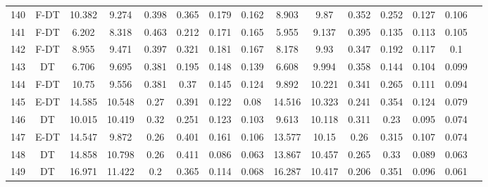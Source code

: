 \begin{longtable}{@{\hskip3pt}c@{\hskip3pt}c@{\hskip3pt}c@{\hskip3pt}c@{\hskip3pt}c@{\hskip3pt}c@{\hskip3pt}c@{\hskip3pt}c@{\hskip3pt}c@{\hskip3pt}c@{\hskip3pt}c@{\hskip3pt}c@{\hskip3pt}c@{\hskip3pt}c@{\hskip3pt}c}
        140 &           F-DT &            10.382 &       9.274 &           0.398 &           0.365 &           0.179 &           0.162 &               8.903 &        9.87 &           0.352 &         0.252 &          0.127 &           0.106 \\
        141 &           F-DT &             6.202 &       8.318 &           0.463 &           0.212 &           0.171 &           0.165 &               5.955 &       9.137 &           0.395 &         0.135 &          0.113 &           0.105 \\
        142 &           F-DT &             8.955 &       9.471 &           0.397 &           0.321 &           0.181 &           0.167 &               8.178 &        9.93 &           0.347 &         0.192 &          0.117 &             0.1 \\
        143 &             DT &             6.706 &       9.695 &           0.381 &           0.195 &           0.148 &           0.139 &               6.608 &       9.994 &           0.358 &         0.144 &          0.104 &           0.099 \\
        144 &           F-DT &             10.75 &       9.556 &           0.381 &            0.37 &           0.145 &           0.124 &               9.892 &      10.221 &           0.341 &         0.265 &          0.111 &           0.094 \\
        145 &           E-DT &            14.585 &      10.548 &            0.27 &           0.391 &           0.122 &            0.08 &              14.516 &      10.323 &           0.241 &         0.354 &          0.124 &           0.079 \\
        146 &             DT &            10.015 &      10.419 &            0.32 &           0.251 &           0.123 &           0.103 &               9.613 &      10.118 &           0.311 &          0.23 &          0.095 &           0.074 \\
        147 &           E-DT &            14.547 &       9.872 &            0.26 &           0.401 &           0.161 &           0.106 &              13.577 &       10.15 &            0.26 &         0.315 &          0.107 &           0.074 \\
        148 &             DT &            14.858 &      10.798 &            0.26 &           0.411 &           0.086 &           0.063 &              13.867 &      10.457 &           0.265 &          0.33 &          0.089 &           0.063 \\
        149 &             DT &            16.971 &      11.422 &             0.2 &           0.365 &           0.114 &           0.068 &              16.287 &      10.417 &           0.206 &         0.351 &          0.096 &           0.061 \\

\end{longtable}

